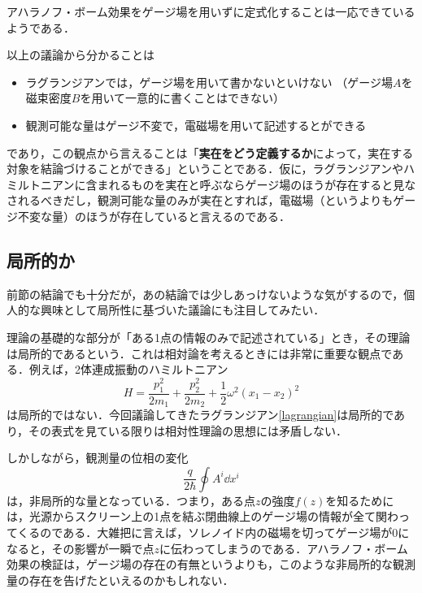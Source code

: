 \documentclass[a4paper,pdflatex,ja=standard]{bxjsarticle}
\begin{document}
\vspace{10pt}
{\small
  アハラノフ・ボーム効果をゲージ場を用いずに定式化することは一応できているようである\cite{Vaidman_2012}．
}
\vspace{10pt}

以上の議論から分かることは
\begin{itemize}
  \item 
  ラグランジアンでは，ゲージ場を用いて書かないといけない
  （ゲージ場$A$を磁束密度$B$を用いて一意的に書くことはできない）
  \item 
  観測可能な量はゲージ不変で，電磁場を用いて記述するとができる
\end{itemize}
であり，この観点から言えることは「\textbf{実在をどう定義するか}によって，実在する対象を結論づけることができる」ということである．仮に，ラグランジアンやハミルトニアンに含まれるものを実在と呼ぶならゲージ場のほうが存在すると見なされるべきだし，観測可能な量のみが実在とすれば，電磁場（というよりもゲージ不変な量）のほうが存在していると言えるのである．


\subsection{局所的か}

前節の結論でも十分だが，あの結論では少しあっけないような気がするので，個人的な興味として局所性に基づいた議論にも注目してみたい．

理論の基礎的な部分が「ある1点の情報のみで記述されている」とき，その理論は局所的であるという．これは相対論を考えるときには非常に重要な観点である．例えば，2体連成振動のハミルトニアン
\begin{equation}
  H
  =
  \frac{p_1^2}{2m_1}
  +
  \frac{p_2^2}{2m_2}
  +
  \frac{1}{2}\omega^2(x_1-x_2)^2
\end{equation}
は局所的ではない．今回議論してきたラグランジアン\eqref{lagrangian}は局所的であり，その表式を見ている限りは相対性理論の思想には矛盾しない．

しかしながら，観測量の位相の変化
\begin{equation}
  \frac{q}{2\hbar}
  \oint A^{i}\dd x^i
\end{equation}
は，非局所的な量となっている．つまり，ある点$z$の強度$f(z)$を知るためには，光源からスクリーン上の1点を結ぶ閉曲線上のゲージ場の情報が全て関わってくるのである．大雑把に言えば，ソレノイド内の磁場を切ってゲージ場が0になると，その影響が一瞬で点$z$に伝わってしまうのである．アハラノフ・ボーム効果の検証は，ゲージ場の存在の有無というよりも，このような非局所的な観測量の存在を告げたといえるのかもしれない．
\end{document}
